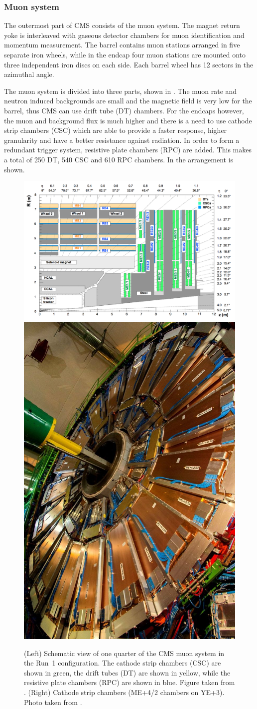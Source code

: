 \clearpage
\subsubsection{Muon system}
\label{sec:MUO}
The outermost part of CMS consists of the muon system. The magnet return yoke is interleaved with gaseous detector chambers for muon identification and momentum measurement. The barrel contains muon stations arranged in five separate iron wheels, while in the endcap four muon stations are mounted onto three independent iron discs on each side. Each barrel wheel has 12 sectors in the azimuthal angle. 

The muon system is divided into three parts, shown in . The muon rate and neutron induced backgrounds are small and the magnetic field is very low for the barrel, thus CMS can use drift tube (DT) chambers. For the endcaps however, the muon and background flux is much higher and there is a need to use cathode strip chambers (CSC) which are able to provide a faster response, higher granularity and have a better resistance against radiation. In order to form a redundant trigger system, resistive plate chambers (RPC) are added. This makes a total of 250 DT, 540 CSC and 610 RPC chambers. In  the arrangement is shown.
\begin{figure}[htbp]
	\centering
	\includegraphics[width=.69\linewidth]{2_ExperimentalSetup/Figures/muonsys}
	\includegraphics[width=0.3\linewidth]{2_ExperimentalSetup/Figures/NfP5131122image6}
	\caption{(Left) Schematic view of one quarter of the CMS muon system in the Run~1 configuration. The cathode strip chambers (CSC) are shown in green, the drift tubes (DT) are shown in yellow, while the resistive plate chambers (RPC) are shown in blue. Figure  taken from \cite{Chatrchyan:1223944}. (Right) Cathode strip chambers (ME+4/2 chambers on YE+3). Photo taken from \cite{muon}.}
	\label{fig:muonsys}
\end{figure}


